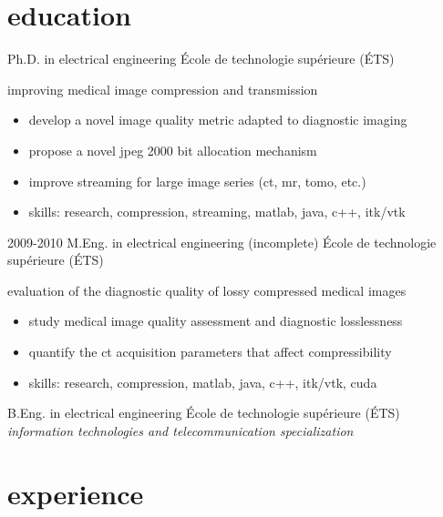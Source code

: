 \documentclass[print]{friggeri-cv}
\begin{document}


\section{education}
\begin{entrylist}
  {Ph.D. in electrical engineering}
  {École de technologie supérieure {\scriptsize (ÉTS)}}
  {improving medical image compression and transmission
  \begin{itemize}
    \item develop a novel image quality metric adapted to diagnostic imaging
    \item propose a novel jpeg 2000 bit allocation mechanism
    \item improve streaming for large image series (ct, mr, tomo, etc.)
    \item skills: research, compression, streaming, matlab, java, c++, itk/vtk
  \end{itemize}}

  \entry
  {2009-2010}
  {M.Eng. in electrical engineering (incomplete\textsuperscript{\tiny\textdaggerdbl})}
  {École de technologie supérieure {\scriptsize (ÉTS)}}
  {evaluation of the diagnostic quality of lossy compressed medical images
  \begin{itemize}
    \item study medical image quality assessment and diagnostic losslessness
    \item quantify the ct acquisition parameters that affect compressibility
    \item skills: research, compression, matlab, java, c++, itk/vtk, cuda
  \end{itemize}}

   {B.Eng. in electrical engineering}
  {École de technologie supérieure {\scriptsize (ÉTS)}}
  {\emph{information technologies and telecommunication specialization}}

\end{entrylist}

\vspace{5mm}

\section{experience}
\end{document}

